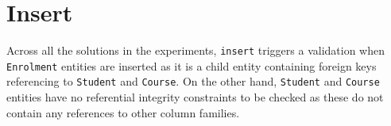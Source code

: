 \section{Insert} \label{s:results-insert}
Across all the solutions in the experiments,   \texttt{insert}  triggers
a validation when \texttt{Enrolment} entities are inserted as it is a child entity
containing foreign keys referencing to \texttt{Student} and \texttt{Course}.
On the other hand,  \texttt{Student} and \texttt{Course} entities have no
referential integrity constraints to be checked as these do not contain any
references to other column families.

